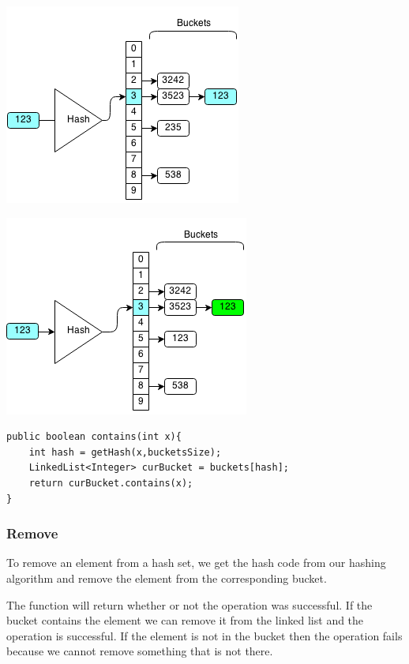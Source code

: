 \documentclass[11pt,oneside]{book}
\makeatletter
\def\maxwidth#1{\ifdim\Gin@nat@width>#1 #1\else\Gin@nat@width\fi}
\makeatother
\begin{document}
\vspace{5px}\includegraphics[width=\maxwidth{\textwidth}]{hashsetcontains2.png}

\vspace{5px}\includegraphics[width=\maxwidth{\textwidth}]{hashsetcontains3.png}

\begin{lstlisting}
public boolean contains(int x){
    int hash = getHash(x,bucketsSize);
    LinkedList<Integer> curBucket = buckets[hash];
    return curBucket.contains(x);
}
\end{lstlisting}

\subsubsection{Remove}

To remove an element from a hash set, we get the hash code from our hashing algorithm and remove the element from the corresponding bucket.

The function will return whether or not the operation was successful. If the bucket contains the element we can remove it from the linked list and the operation is successful. If the element is not in the bucket then the operation fails because we cannot remove something that is not there.
\end{document}
